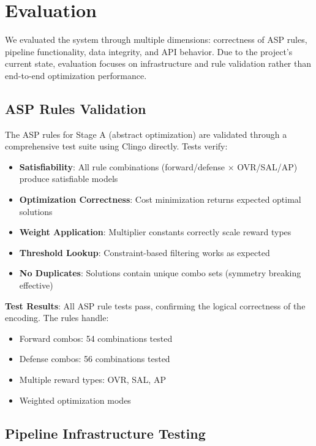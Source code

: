 \section{Evaluation}

We evaluated the system through multiple dimensions: correctness of ASP rules, pipeline functionality, data integrity, and API behavior. Due to the project's current state, evaluation focuses on infrastructure and rule validation rather than end-to-end optimization performance.

\subsection{ASP Rules Validation}

The ASP rules for Stage A (abstract optimization) are validated through a comprehensive test suite using Clingo directly. Tests verify:

\begin{itemize}
    \item \textbf{Satisfiability}: All rule combinations (forward/defense × OVR/SAL/AP) produce satisfiable models
    \item \textbf{Optimization Correctness}: Cost minimization returns expected optimal solutions
    \item \textbf{Weight Application}: Multiplier constants correctly scale reward types
    \item \textbf{Threshold Lookup}: Constraint-based filtering works as expected
    \item \textbf{No Duplicates}: Solutions contain unique combo sets (symmetry breaking effective)
\end{itemize}

\textbf{Test Results}: All ASP rule tests pass, confirming the logical correctness of the encoding. The rules handle:
\begin{itemize}
    \item Forward combos: 54 combinations tested
    \item Defense combos: 56 combinations tested
    \item Multiple reward types: OVR, SAL, AP
    \item Weighted optimization modes
\end{itemize}

\subsection{Pipeline Infrastructure Testing}

